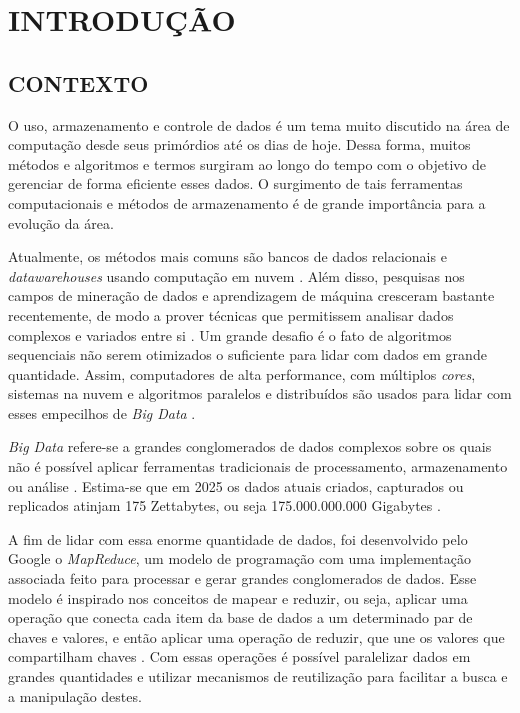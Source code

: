\chapter{INTRODUÇÃO} \label{cha:introducao}

\section{CONTEXTO} \label{sec:contexto}

O uso, armazenamento e controle de dados é um tema muito discutido na área de computação desde seus primórdios até os dias de hoje. Dessa forma, muitos métodos e algoritmos e termos surgiram ao longo do tempo com o objetivo de gerenciar de forma eficiente esses dados. O surgimento de tais ferramentas computacionais e métodos de armazenamento é de grande importância para a evolução da área.

Atualmente, os métodos mais comuns são bancos de dados relacionais e \textit{\gls{datawarehouse}s} usando computação em nuvem \cite{PastAndFutureTrendsData19}. Além disso, pesquisas nos campos de mineração de dados e aprendizagem de máquina cresceram bastante recentemente, de modo a prover técnicas que permitissem analisar dados complexos e variados entre si \cite{ProgrammingBigData22}. Um grande desafio é o fato de algoritmos sequenciais não serem otimizados o suficiente para lidar com dados em grande quantidade. Assim, computadores de alta performance, com múltiplos \textit{cores}, sistemas na nuvem e algoritmos paralelos e distribuídos são usados para lidar com esses empecilhos de \textit{Big Data} \cite{ProgrammingBigData22}.

\textit{Big Data} refere-se a grandes conglomerados de dados complexos sobre os quais não é possível aplicar ferramentas tradicionais de processamento, armazenamento ou análise \cite{OptmizationSoftwareHadoop18}. Estima-se que em 2025 os dados atuais criados, capturados ou replicados atinjam 175 Zettabytes, ou seja 175.000.000.000 Gigabytes \cite{DigitalizationWorld18}.

A fim de lidar com essa enorme quantidade de dados, foi desenvolvido pelo Google o \textit{MapReduce}, um modelo de programação com uma implementação associada feito para processar e gerar grandes conglomerados de dados. Esse modelo é inspirado nos conceitos de mapear e reduzir, ou seja, aplicar uma operação que conecta cada item da base de dados a um determinado par de chaves e valores, e então aplicar uma operação de reduzir, que une os valores que compartilham chaves \cite{MapReduce08}. Com essas operações é possível paralelizar dados em grandes quantidades e utilizar mecanismos de reutilização para facilitar a busca e a manipulação destes.

